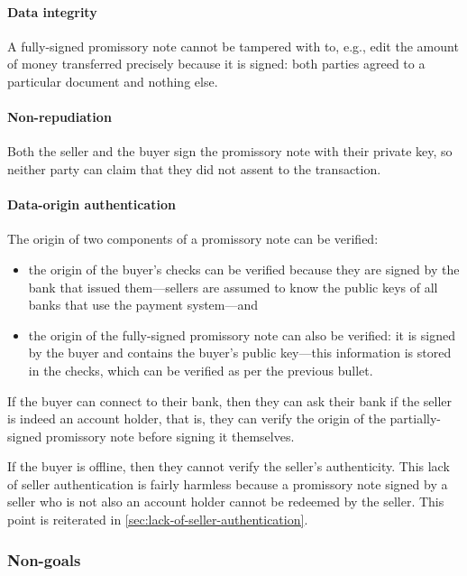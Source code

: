 \documentclass[12pt,a4paper]{article}
\begin{document}
\begin{multicols}{2}
	\paragraph{Data integrity}

	A fully-signed promissory note cannot be tampered with to, e.g., edit the amount of money transferred precisely because it is signed: both parties agreed to a particular document and nothing else.

	\paragraph{Non-repudiation}
	
	Both the seller and the buyer sign the promissory note with their private key, so neither party can claim that they did not assent to the transaction.
	
	\paragraph{Data-origin authentication}
	
	The origin of two components of a promissory note can be verified:
	
	\begin{itemize}
		\item the origin of the buyer's checks can be verified because they are signed by the bank that issued them---sellers are assumed to know the public keys of all banks that use the payment system---and
	
		\item the origin of the fully-signed promissory note can also be verified: it is signed by the buyer and contains the buyer's public key---this information is stored in the checks, which can be verified as per the previous bullet.
	\end{itemize}

	If the buyer can connect to their bank, then they can ask their bank if the seller is indeed an account holder, that is, they can verify the origin of the partially-signed promissory note before signing it themselves.
	
	If the buyer is offline, then they cannot verify the seller's authenticity. This lack of seller authentication is fairly harmless because a promissory note signed by a seller who is not also an account holder cannot be redeemed by the seller. This point is reiterated in \autoref{sec:lack-of-seller-authentication}.

	\subsubsection{Non-goals}


\end{multicols}
\end{document}
